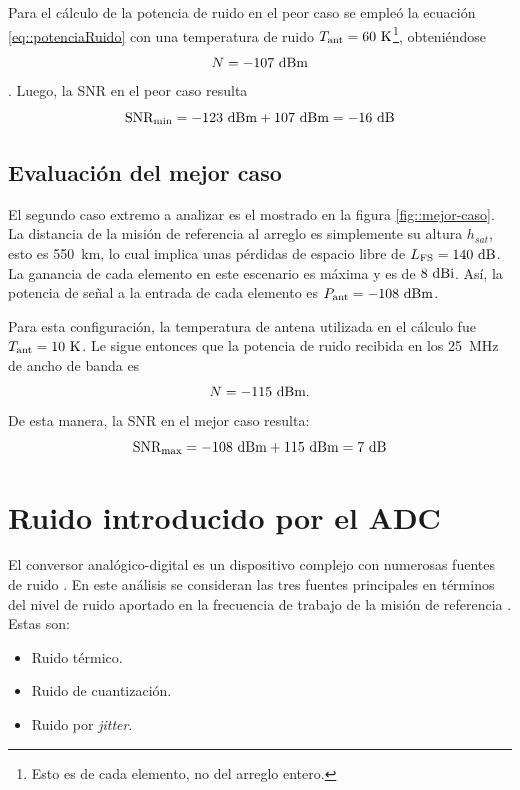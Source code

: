 \documentclass[../../main.tex]{subfiles}
\begin{document}
Para el cálculo de la potencia de ruido en el peor caso se empleó la ecuación \ref{eq::potenciaRuido} con una temperatura de ruido $T_\textrm{ant} = 60~\textrm{K}$\footnote{Esto es de cada elemento, no del arreglo entero.}\cite{temp-antena}, obteniéndose \[N = -107~\textrm{dBm}\]. Luego, la SNR en el peor caso resulta
\begin{equation}
    \textrm{SNR}_\textrm{min} = -123~\textrm{dBm} + 107~\textrm{dBm} = -16~\textrm{dB}
    \label{eq::peor-snr}
\end{equation}

\subsection{Evaluación del mejor caso}
El segundo caso extremo a analizar es el mostrado en la figura \ref{fig::mejor-caso}. La distancia de la misión de referencia al arreglo es simplemente su altura $h_{sat}$, esto es 550~km, lo cual implica unas pérdidas de espacio libre de $L_\textrm{FS} = 140~\textrm{dB}$. La ganancia de cada elemento en este escenario es máxima y es de $8~\textrm{dBi}$. Así, la potencia de señal a la entrada de cada elemento es $P_\textrm{ant} = -108~\textrm{dBm}$.

Para esta configuración, la temperatura de antena utilizada en el cálculo fue $T_\textrm{ant} = 10~\textrm{K}$\cite{temp-antena}. Le sigue entonces que la potencia de ruido recibida en los 25~MHz de ancho de banda es \[N = -115~\textrm{dBm}.\] De esta manera, la SNR en el mejor caso resulta:
\begin{equation}
    \textrm{SNR}_\textrm{max} = -108~\textrm{dBm} + 115~\textrm{dBm} = 7~\textrm{dB}
    \label{eq::mejor-snr}
\end{equation}

\section{Ruido introducido por el ADC}
El conversor analógico-digital es un dispositivo complejo con numerosas fuentes de ruido \cite{ruidos-adc}. En este análisis se consideran las tres fuentes principales en términos del nivel de ruido aportado en la frecuencia de trabajo de la misión de referencia \cite{AD9249}. Estas son:
\begin{itemize}
    \item Ruido térmico.
    \item Ruido de cuantización.
    \item Ruido por \textit{jitter}.
\end{itemize}
\end{document}
